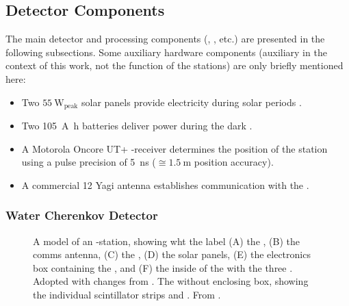 \subsection{Detector Components}
\label{ssec:detector-components}

The main detector and processing components (\WCD, \UUB, etc.) are presented in
the following subsections. Some auxiliary hardware components (auxiliary in the
context of this work, not the function of the stations) are only briefly 
mentioned here:

\begin{itemize}
	\item Two $\SI{55}{\watt}_\mathrm{peak}$ solar panels provide 
	electricity during solar periods 
	\cite{collaborationPierreAugerObservatory2016}.
	\item Two \SI{105}{\ampere\hour} batteries deliver power during	the 
	dark \cite{collaborationPierreAugerObservatory2016}.
	\item A Motorola Oncore UT+ \GPS-receiver determines the position of 
	the station using a pulse precision of \SI{5}{\nano\second} 
	\cite{networktimefoundationMotorolaOncoreGPS} ($\cong\SI{1.5}{\meter}$
	position accuracy).
	\item A commercial \SI{12}{\dBi} Yagi antenna \cite{rfwel12DBiYagi} 
	establishes communication with the \CDAS.
\end{itemize}

\subsubsection{Water Cherenkov Detector}
\label{sssec:wcd}

\begin{figure}[t]
  \centering
  \hspace{0.2cm}
  \caption[]{ A model of an \SD-station, showing
  wht the label (A) the \RD, (B) the comms antenna, (C) the \SSD, (D) the solar
  panels, (E) the electronics box containing the \UUB, and (F) the inside of 
  the \WCD with the three \LPMTs. Adopted with changes from 
  \cite{filipPotentialNeuralNetwork2023}.  The 
  \SSD without enclosing box, showing the individual scintillator strips and 
  \WLSs. From \cite{schmidtUHECR2024ProceedingEdits25}.}
  \label{fig:sd-station-components}
\end{figure}

